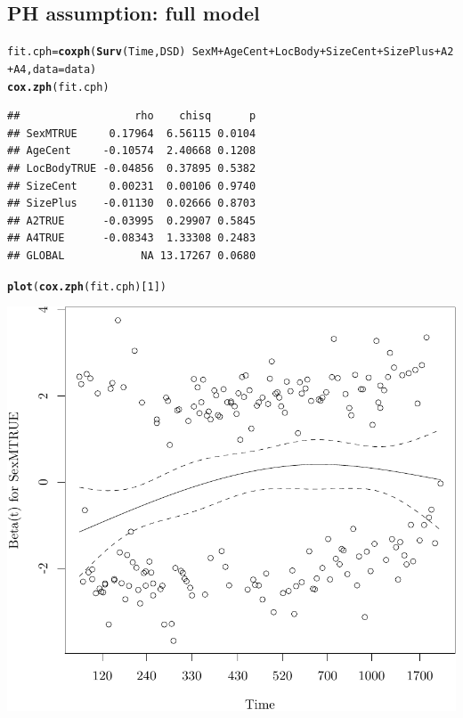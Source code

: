 \documentclass{article}\usepackage[]{graphicx}\usepackage[]{color}
\makeatletter
\def\maxwidth{ %
  \ifdim\Gin@nat@width>\linewidth
    \linewidth
  \else
    \Gin@nat@width
  \fi
}
\newcommand{\hlnum}[1]{\textcolor[rgb]{0.686,0.059,0.569}{#1}}%
\newcommand{\hlopt}[1]{\textcolor[rgb]{0,0,0}{#1}}%
\newcommand{\hlstd}[1]{\textcolor[rgb]{0.345,0.345,0.345}{#1}}%
\newcommand{\hlkwb}[1]{\textcolor[rgb]{0.69,0.353,0.396}{#1}}%
\newcommand{\hlkwc}[1]{\textcolor[rgb]{0.333,0.667,0.333}{#1}}%
\newcommand{\hlkwd}[1]{\textcolor[rgb]{0.737,0.353,0.396}{\textbf{#1}}}%
\newenvironment{kframe}{%
 \def\at@end@of@kframe{}%
 \ifinner\ifhmode%
  \def\at@end@of@kframe{\end{minipage}}%
  \begin{minipage}{\columnwidth}%
 \fi\fi%
 \def\FrameCommand##1{\hskip\@totalleftmargin \hskip-\fboxsep
 \colorbox{shadecolor}{##1}\hskip-\fboxsep
     \hskip-\linewidth \hskip-\@totalleftmargin \hskip\columnwidth}%
 \MakeFramed {\advance\hsize-\width
   \@totalleftmargin\z@ \linewidth\hsize
   \@setminipage}}%
 {\par\unskip\endMakeFramed%
 \at@end@of@kframe}
\newenvironment{knitrout}{}{} %
\makeatother
\begin{document}
\subsection{PH assumption: full model}
\begin{knitrout}
\color{fgcolor}\begin{kframe}
\begin{alltt}
\hlstd{fit.cph} \hlkwb{=} \hlkwd{coxph}\hlstd{(}\hlkwd{Surv}\hlstd{(Time, DSD)} \hlopt{~} \hlstd{SexM} \hlopt{+} \hlstd{AgeCent} \hlopt{+} \hlstd{LocBody} \hlopt{+} \hlstd{SizeCent} \hlopt{+} \hlstd{SizePlus} \hlopt{+} \hlstd{A2} \hlopt{+} \hlstd{A4,} \hlkwc{data} \hlstd{= data)}
\hlkwd{cox.zph}\hlstd{(fit.cph)}
\end{alltt}
\begin{verbatim}
##                  rho    chisq      p
## SexMTRUE     0.17964  6.56115 0.0104
## AgeCent     -0.10574  2.40668 0.1208
## LocBodyTRUE -0.04856  0.37895 0.5382
## SizeCent     0.00231  0.00106 0.9740
## SizePlus    -0.01130  0.02666 0.8703
## A2TRUE      -0.03995  0.29907 0.5845
## A4TRUE      -0.08343  1.33308 0.2483
## GLOBAL            NA 13.17267 0.0680
\end{verbatim}
\begin{alltt}
\hlkwd{plot}\hlstd{(}\hlkwd{cox.zph}\hlstd{(fit.cph)[}\hlnum{1}\hlstd{])}
\end{alltt}
\end{kframe}

{\centering \includegraphics[width=\maxwidth]{figure/05-eda-ph-check-full-1} 

}
\end{knitrout}
\end{document}
